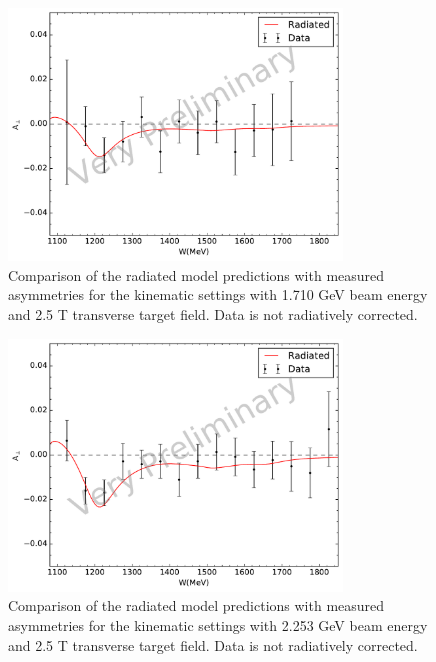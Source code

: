\begin{figure}[p!]
  \centering
  \includegraphics[width=0.79\textwidth]{figs/asymmetry-data-model-17102590.pdf}
  \caption[Asymmetries with $E=1.710$ GeV and $B=2.5$ T.]{Comparison of the radiated model predictions with measured asymmetries for the kinematic settings with 1.710 GeV beam energy and 2.5 T transverse target field. Data is not radiatively corrected. \label{C8S2F4}}
\end{figure}

\begin{figure}[p!]
  \centering
  \includegraphics[width=0.79\textwidth]{figs/asymmetry-data-model-22532590.pdf}
  \caption[Asymmetries with $E=2.253$ GeV and $B=2.5$ T.]{Comparison of the radiated model predictions with measured asymmetries for the kinematic settings with 2.253 GeV beam energy and 2.5 T transverse target field. Data is not radiatively corrected. \label{C8S2F5}}
\end{figure}

